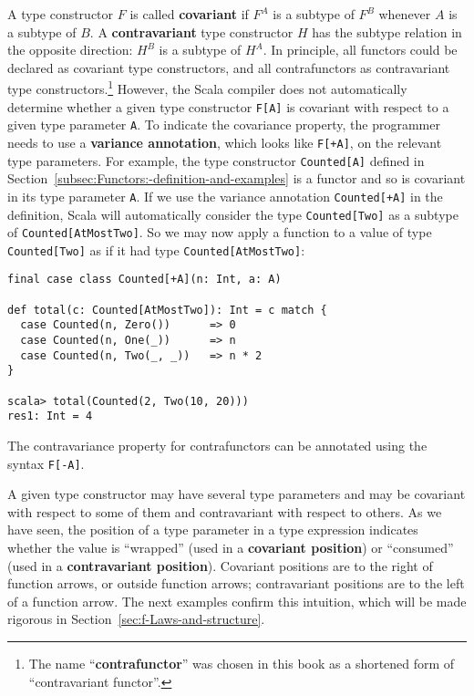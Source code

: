 A type constructor $F$ is called \textbf{covariant}
if $F^{A}$ is a subtype of $F^{B}$ whenever $A$ is a subtype of
$B$. A \textbf{contravariant}
type constructor $H$ has the subtype relation in the opposite direction:
$H^{B}$ is a subtype of $H^{A}$. In principle, all functors could
be declared as covariant type constructors, and all contrafunctors
as contravariant type constructors.\footnote{The name \textsf{``}\textbf{contrafunctor}\textsf{''} was chosen
in this book as a shortened form of \textsf{``}contravariant
functor\textsf{''}.} However, the Scala compiler does not automatically determine whether
a given type constructor \lstinline!F[A]! is covariant with respect
to a given type parameter \lstinline!A!. To indicate the covariance
property, the programmer needs to use a \textbf{variance
annotation}, which looks like \lstinline!F[+A]!, on the relevant
type parameters. For example, the type constructor \lstinline!Counted[A]!
defined in Section~\ref{subsec:Functors:-definition-and-examples}
is a functor and so is covariant in its type parameter \lstinline!A!.
If we use the variance annotation \lstinline!Counted[+A]! in the
definition, Scala will automatically consider the type \lstinline!Counted[Two]!
as a subtype of \lstinline!Counted[AtMostTwo]!. So we may now apply
a function to a value of type \lstinline!Counted[Two]! as if it had
type \lstinline!Counted[AtMostTwo]!:
\begin{lstlisting}
final case class Counted[+A](n: Int, a: A)

def total(c: Counted[AtMostTwo]): Int = c match {
  case Counted(n, Zero())      => 0
  case Counted(n, One(_))      => n
  case Counted(n, Two(_, _))   => n * 2
}

scala> total(Counted(2, Two(10, 20)))
res1: Int = 4
\end{lstlisting}

The contravariance property for contrafunctors can be annotated using
the syntax \lstinline!F[-A]!.

A given type constructor may have several type parameters and may
be covariant with respect to some of them and contravariant with respect
to others. As we have seen, the position of a type parameter in a
type expression indicates whether the value is \textsf{``}wrapped\textsf{''} (used
in a \textbf{covariant position}) or \textsf{``}consumed\textsf{''}
(used in a \textbf{contravariant position}).
Covariant positions are to the right of function arrows, or outside
function arrows; contravariant positions are to the left of a function
arrow. The next examples confirm this intuition, which will be made
rigorous in Section~\ref{sec:f-Laws-and-structure}.

